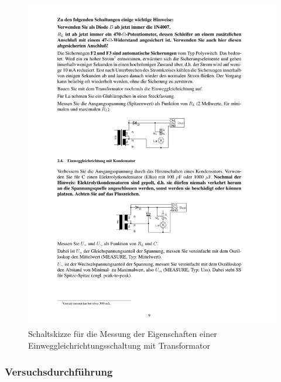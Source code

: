 \documentclass[12pt,a4paper]{article}
\begin{document}
\begin{figure}[H] 
  \centering
    \includegraphics[trim = 10mm 80mm 10mm 170mm, clip, scale = 1]{ep2_14[Page9].pdf}
  	\caption[Schaltskizze für die Messung der Eigenschaften einer Einweggleichrichtungsschaltung mit Transformator]{Schaltskizze für die Messung der Eigenschaften einer Einweggleichrichtungsschaltung mit Transformator\footnotemark}
  \label{fig:2_5}
\end{figure}

\subsubsection{Versuchsdurchführung}
\end{document}
